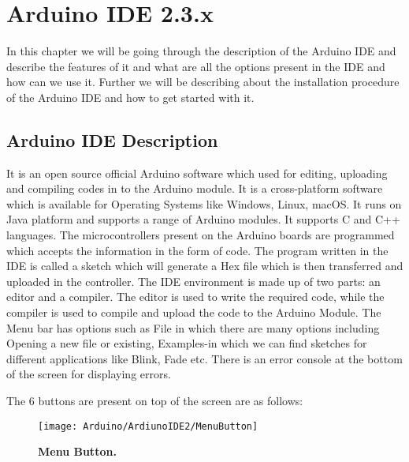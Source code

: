 %
%
%



\chapter{Arduino IDE 2.3.x}\label{ArduinoIDE2}



In this chapter we will be going through the description of the Arduino IDE and describe the features of it and what are all the options present in the IDE and how can we use it. Further we will be describing about the installation procedure of the Arduino IDE and how to get started with it.


\section{Arduino IDE Description}\label{ArduinoIDE}

It is an open source official Arduino software which used for editing, uploading and compiling codes in to the Arduino module. It is a cross-platform software which is available for Operating Systems like Windows, Linux, macOS. It runs on Java platform and supports a range of Arduino modules. It supports C and C++ languages. The microcontrollers present on the Arduino boards are programmed which accepts the information in the form of code. The program written in the IDE is called a sketch which will generate a Hex file which is then transferred and uploaded in the controller.
The IDE environment is made up of two parts: an editor and a compiler. The editor is used to write the required code, while the compiler is used to compile and upload the code to the Arduino Module.\cite{Fezari:2018}
The Menu bar has options such as File in which there are many options including Opening a new file or existing, Examples-in which we can find sketches for different applications like Blink, Fade etc. There is an error console at the bottom of the screen for displaying errors.

The 6 buttons are present on top of the screen are as follows:

\begin{figure}[H]\centering
    \texttt{[image: Arduino/ArdiunoIDE2/MenuButton]}
    
    \caption{\textbf{Menu Button.}}
    \label{fig::Menu Button}		
\end{figure}


